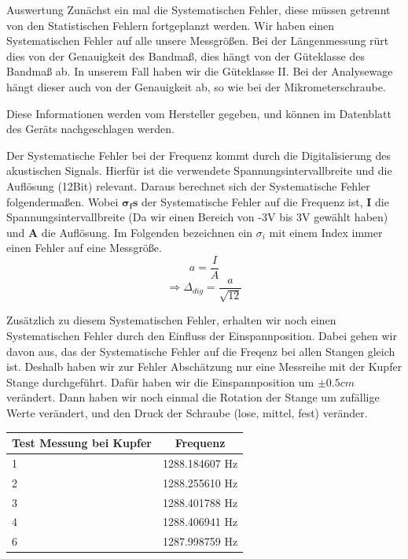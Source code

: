\documentclass[twoside]{protokoll}
\begin{document}
\begin{aufgabe}{Auswertung}
Zunächst ein mal die Systematischen Fehler, diese müssen getrennt von den Statistischen Fehlern fortgeplanzt werden.
Wir haben einen Systematischen Fehler auf alle unsere Messgrößen.
Bei der Längenmessung rürt dies von der Genauigkeit des Bandmaß, dies hängt von der Güteklasse des Bandmaß ab.
In unserem Fall haben wir die Güteklasse II.
Bei der Analysewage  hängt dieser auch von der Genauigkeit ab, so wie bei der Mikrometerschraube. 
 
Diese Informationen werden vom Hersteller gegeben, und können im Datenblatt des Geräts nachgeschlagen werden. 


Der Systematische Fehler bei der Frequenz kommt durch die Digitalisierung des akustischen Signals. Hierfür ist die verwendete Spannungsintervallbreite und die Auflösung (12Bit) relevant. Daraus berechnet sich der Systematische Fehler folgendermaßen. Wobei  $\mathbf{\sigma_fs}$ der Systematische Fehler auf die Frequenz ist, \textbf{I} die Spannungsintervallbreite (Da wir einen Bereich von -3V bis 3V gewählt haben) und \textbf{A} die Auflösung. Im Folgenden bezeichnen ein $\sigma_i$ mit einem Index immer einen Fehler auf eine Messgröße. 
\begin{equation}
         a = \frac{I}{A}
    \end{equation}
\begin{equation}
         \Rightarrow 
         \Delta_{dig} = \frac{a}{\sqrt{12}}
\end{equation}

Zusätzlich zu diesem Systematischen Fehler, erhalten wir noch einen Systematischen Fehler durch den Einfluss der Einspannposition.
Dabei gehen wir davon aus, das der Systematische Fehler auf die Freqenz bei allen Stangen gleich ist.
Deshalb haben wir zur Fehler Abschätzung nur eine Messreihe mit der Kupfer Stange durchgeführt.
Dafür haben wir die Einspannposition um $\pm{0.5}{cm}$ verändert.
Dann haben wir noch einmal die Rotation der Stange um zufällige Werte verändert, und den Druck der Schraube (lose, mittel, fest) veränder.
 

\begin{table}[H]
    \centering
    \begin{tabularx}{0.7\textwidth}{X c} %
        \toprule
        \textbf{Test Messung bei Kupfer} & \textbf{Frequenz} \\
        \midrule
            1 & 1288.184607 Hz \\
            2 & 1288.255610 Hz \\
            3 & 1288.401788 Hz \\
            4 & 1288.406941 Hz \\
            6 & 1287.998759 Hz \\
        \bottomrule
    \end{tabularx}
    \label{tab:mytable}
\end{table}


\end{aufgabe}
\end{document}
